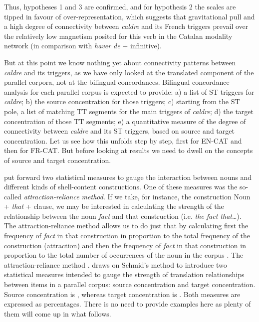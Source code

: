 \documentclass[output=paper,english,spanish,german,english]{langsci/langscibook}
\begin{document}
Thus, hypotheses 1 and 3 are confirmed, and for hypothesis 2 the scales are tipped in favour of over-representation, which suggests that gravitational pull and a high degree of connectivity between \textit{caldre} and its French triggers prevail over the relatively low magnetism posited for this verb in the Catalan modality network (in comparison with \textit{haver de} + infinitive).

But at this point we know nothing yet about connectivity patterns between \textit{caldre} and its triggers, as we have only looked at the translated component of the parallel corpora, not at the bilingual concordances. Bilingual concordance analysis for each parallel corpus is expected to provide: a) a list of ST triggers for \textit{caldre}; b) the source concentration for those triggers; c) starting from the ST pole, a list of matching TT segments for the main triggers of \textit{caldre}; d) the target concentration of those TT segments; e) a quantitative measure of the degree of connectivity between \textit{caldre} and its ST triggers, based on source and target concentration. Let us see how this unfolds step by step, first for EN-CAT and then for FR-CAT. But before looking at results we need to dwell on the concepts of source and target concentration.

\citet{schmid10} put forward two statistical measures to gauge the interaction between nouns and different kinds of shell-content constructions. One of these measures was the so-called \textit{attraction-reliance method}. If we take, for instance, the construction Noun + \textit{that} + clause, we may be interested in calculating the strength of the relationship between the noun \textit{fact} and that construction (i.e. \textit{the fact that}\dots). The attraction-reliance method allows us to do just that by calculating first the frequency of \textit{fact} in that construction in proportion to the total frequency of the construction (attraction) and then the frequency of \textit{fact} in that construction in proportion to the total number of occurrences of the noun in the corpus \parencite[107]{schmid10}. The attraction-reliance method . \citet[30ff]{halverson17} draws on Schmid’s method to introduce two statistical measures intended to gauge the strength of translation relationships between items in a parallel corpus: source concentration and target concentration. Source concentration is , whereas target concentration is . Both measures are expressed as percentages. There is no need to provide examples here as plenty of them will come up in what follows.
\end{document}
